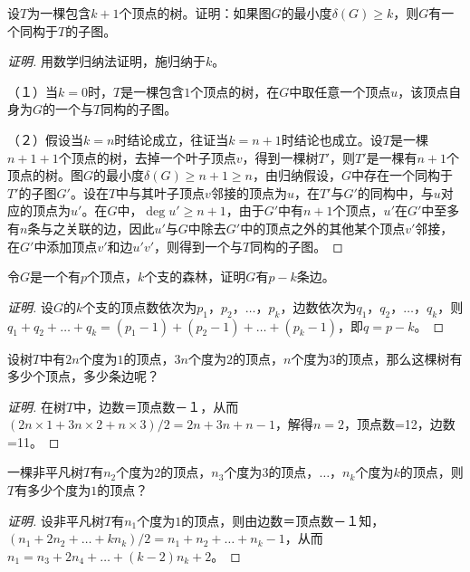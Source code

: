 \documentclass{article}
\begin{document}
\begin{CJK}{UTF8}{gbsn}
  \begin{Exercise}
    设$T$为一棵包含$k+1$个顶点的树。证明：如果图$G$的最小度$\delta(G)\geq k$，则$G$有一个同构于$T$的子图。
  \end{Exercise}
  \begin{proof}[证明]
    用数学归纳法证明，施归纳于$k$。
  
    （１）当$k=0$时，$T$是一棵包含$1$个顶点的树，在$G$中取任意一个顶点$u$，该顶点自身为$G$的一个与$T$同构的子图。
  
    （２）假设当$k=n$时结论成立，往证当$k=n+1$时结论也成立。设$T$是一棵$n+1+1$个顶点的树，去掉一个叶子顶点$v$，得到一棵树$T'$，则$T'$是一棵有$n+1$个顶点的树。图$G$的最小度$\delta(G)\geq n+1\geq n$，由归纳假设，$G$中存在一个同构于$T'$的子图$G'$。设在$T$中与其叶子顶点$v$邻接的顶点为$u$，在$T'$与$G'$的同构中，与$u$对应的顶点为$u'$。在$G$中，$\deg u'\geq n+1$，由于$G'$中有$n+1$个顶点，$u'$在$G'$中至多有$n$条与之关联的边，因此$u'$与$G$中除去$G'$中的顶点之外的其他某个顶点$v'$邻接，在$G'$中添加顶点$v'$和边$u'v'$，则得到一个与$T$同构的子图。
  \end{proof}
  \begin{Exercise}
  令$G$是一个有$p$个顶点，$k$个支的森林，证明$G$有$p-k$条边。
  \end{Exercise}
  \begin{proof}[证明]设$G$的$k$个支的顶点数依次为$p_1$，$p_2$，$\ldots$，$p_k$，边数依次为$q_1$，$q_2$，$\ldots$，$q_k$，则$q_1+q_2+\ldots + q_k=(p_1 - 1)+(p_2 - 1) +\ldots + (p_k - 1)$，即$q=p-k$。
  \end{proof}
  \begin{Exercise}
    设树$T$中有$2n$个度为$1$的顶点，$3n$个度为$2$的顶点，$n$个度为$3$的顶点，那么这棵树有多少个顶点，多少条边呢？
  \end{Exercise}
  \begin{proof}[证明]
    在树$T$中，边数＝顶点数－１，从而$(2n\times 1 + 3n \times 2 + n \times 3)/2 = 2n + 3n + n - 1$，解得$n=2$，顶点数=12，边数=11。
  \end{proof}
  \begin{Exercise}
    一棵非平凡树$T$有$n_2$个度为$2$的顶点，$n_3$个度为$3$的顶点，$\ldots$，$n_k$个度为$k$的顶点，则$T$有多少个度为$1$的顶点？
  \end{Exercise}
  \begin{proof}[证明]
    设非平凡树$T$有$n_1$个度为$1$的顶点，则由边数＝顶点数－１知，$(n_1 + 2n_2 + \ldots + kn_k)/2 = n_1 + n_2 + \ldots + n_k -1$，从而$n_1 = n_3 + 2n_4 + \ldots + (k-2)n_k + 2$。
  \end{proof}
  


\end{CJK}
\end{document}
